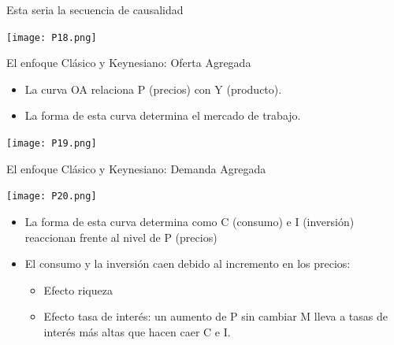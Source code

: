 \documentclass{beamer}
\begin{document}

\begin{frame}{Esta seria la secuencia de causalidad}

\centering\texttt{[image: P18.png]}\

\end{frame}


\begin{frame}{El enfoque Clásico y Keynesiano: Oferta Agregada}

\begin{itemize}
        \footnotesize\item La curva OA relaciona P (precios) con Y (producto).
        \footnotesize\item La forma de esta curva determina el mercado de trabajo.
\end{itemize}
\vspace{3mm}
\centering\texttt{[image: P19.png]}\

\end{frame}


\begin{frame}{El enfoque Clásico y Keynesiano: Demanda Agregada}

\centering\texttt{[image: P20.png]}\

    \begin{itemize}
        \item La forma de esta curva determina como C (consumo) e I (inversión) reaccionan frente al nivel de P (precios)
        \item El consumo y la inversión caen debido al incremento en los precios:
            \begin{itemize}
                \item Efecto riqueza
                \item Efecto tasa de interés: un aumento de P sin cambiar M lleva a tasas de interés más altas que hacen caer C e I.
            \end{itemize}
    \end{itemize}

\end{frame}

\end{document}
